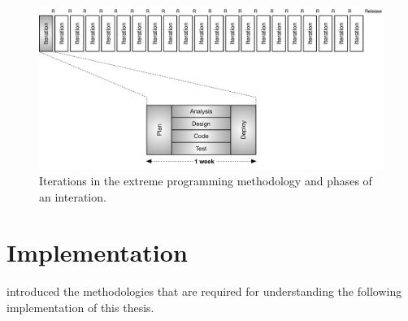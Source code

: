 \documentclass[%
    a4paper,    %
    justified,  %
    nobib,      %
    openany     %
]{tufte-book}
\begin{document}
\begin{figure}[ht]
  \includegraphics[width=0.95\linewidth]{images/xp}
  \caption{Iterations in the extreme programming methodology and phases of an
    interation.~\cite[p. 18]{shore-aad-2007}}
  \label{fig:xp}
\end{figure}


\chapter{Implementation}
\label{chap:implementation}


 introduced the methodologies that are required
for understanding the following implementation of this thesis.
\end{document}
